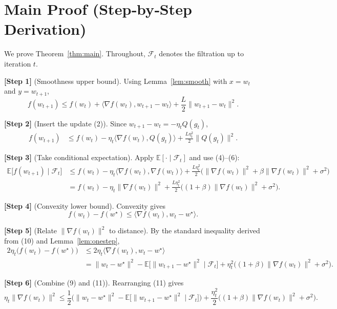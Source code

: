 \documentclass{article}
\newcommand{\E}{\mathbb{E}}
\begin{document}
\section*{Main Proof (Step‑by‑Step Derivation)}
We prove Theorem~\ref{thm:main}. Throughout, $\mathcal{F}_{t}$ denotes the filtration up to iteration $t$.

\bigskip
\noindent\textbf{[Step 1]} (Smoothness upper bound). Using Lemma~\ref{lem:smooth} with $x=w_{t}$ and $y=w_{t+1}$,
\[
f(w_{t+1})\le f(w_{t})+\langle\nabla f(w_{t}),w_{t+1}-w_{t}\rangle+\frac{L}{2}\|w_{t+1}-w_{t}\|^{2}.
\tag{7}
\]

\noindent\textbf{[Step 2]} (Insert the update (2)). Since $w_{t+1}-w_{t}=-\eta_{t}Q(g_{t})$,
\[
\begin{aligned}
f(w_{t+1}) &\le f(w_{t})-\eta_{t}\langle\nabla f(w_{t}),Q(g_{t})\rangle
+\frac{L\eta_{t}^{2}}{2}\|Q(g_{t})\|^{2}.
\end{aligned}
\tag{8}
\]

\noindent\textbf{[Step 3]} (Take conditional expectation). Apply $\E[\cdot\mid\mathcal{F}_{t}]$ and use (4)–(6):
\[
\begin{aligned}
\E\!\big[f(w_{t+1})\mid\mathcal{F}_{t}\big]
&\le f(w_{t})-\eta_{t}\langle\nabla f(w_{t}),\nabla f(w_{t})\rangle
+\frac{L\eta_{t}^{2}}{2}\Big(\|\nabla f(w_{t})\|^{2}+\beta\|\nabla f(w_{t})\|^{2}+\sigma^{2}\Big)\\
&= f(w_{t})-\eta_{t}\|\nabla f(w_{t})\|^{2}
+\frac{L\eta_{t}^{2}}{2}\big((1+\beta)\|\nabla f(w_{t})\|^{2}+\sigma^{2}\big).
\end{aligned}
\tag{9}
\]

\noindent\textbf{[Step 4]} (Convexity lower bound). Convexity gives
\[
f(w_{t})-f(w^{\star})\le\langle\nabla f(w_{t}),w_{t}-w^{\star}\rangle.
\tag{10}
\]

\noindent\textbf{[Step 5]} (Relate $\|\nabla f(w_{t})\|^{2}$ to distance). By the standard inequality derived from (10) and Lemma~\ref{lem:onestep},
\[
\begin{aligned}
2\eta_{t}\big(f(w_{t})-f(w^{\star})\big)
&\le 2\eta_{t}\langle\nabla f(w_{t}),w_{t}-w^{\star}\rangle \\
&= \|w_{t}-w^{\star}\|^{2}-\E\!\big[\|w_{t+1}-w^{\star}\|^{2}\mid\mathcal{F}_{t}\big]
+\eta_{t}^{2}\big((1+\beta)\|\nabla f(w_{t})\|^{2}+\sigma^{2}\big) .
\end{aligned}
\tag{11}
\]

\noindent\textbf{[Step 6]} (Combine (9) and (11)). Rearranging (11) gives
\[
\eta_{t}\|\nabla f(w_{t})\|^{2}
\le \frac{1}{2}\Big(\|w_{t}-w^{\star}\|^{2}
-\E\!\big[\|w_{t+1}-w^{\star}\|^{2}\mid\mathcal{F}_{t}\big]\Big)
+\frac{\eta_{t}^{2}}{2}\big((1+\beta)\|\nabla f(w_{t})\|^{2}+\sigma^{2}\big).
\tag{12}
\]
\end{document}
